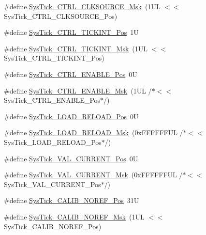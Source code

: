 \begin{DoxyCompactItemize}
\item 
\#define \hyperlink{group___c_m_s_i_s___sys_tick_gaa41d06039797423a46596bd313d57373}{Sys\+Tick\+\_\+\+C\+T\+R\+L\+\_\+\+C\+L\+K\+S\+O\+U\+R\+C\+E\+\_\+\+Msk}~(1\+U\+L $<$$<$ Sys\+Tick\+\_\+\+C\+T\+R\+L\+\_\+\+C\+L\+K\+S\+O\+U\+R\+C\+E\+\_\+\+Pos)
\item 
\#define \hyperlink{group___c_m_s_i_s___sys_tick_ga88f45bbb89ce8df3cd2b2613c7b48214}{Sys\+Tick\+\_\+\+C\+T\+R\+L\+\_\+\+T\+I\+C\+K\+I\+N\+T\+\_\+\+Pos}~1U
\item 
\#define \hyperlink{group___c_m_s_i_s___sys_tick_ga95bb984266ca764024836a870238a027}{Sys\+Tick\+\_\+\+C\+T\+R\+L\+\_\+\+T\+I\+C\+K\+I\+N\+T\+\_\+\+Msk}~(1\+U\+L $<$$<$ Sys\+Tick\+\_\+\+C\+T\+R\+L\+\_\+\+T\+I\+C\+K\+I\+N\+T\+\_\+\+Pos)
\item 
\#define \hyperlink{group___c_m_s_i_s___sys_tick_ga0b48cc1e36d92a92e4bf632890314810}{Sys\+Tick\+\_\+\+C\+T\+R\+L\+\_\+\+E\+N\+A\+B\+L\+E\+\_\+\+Pos}~0U
\item 
\#define \hyperlink{group___c_m_s_i_s___sys_tick_ga16c9fee0ed0235524bdeb38af328fd1f}{Sys\+Tick\+\_\+\+C\+T\+R\+L\+\_\+\+E\+N\+A\+B\+L\+E\+\_\+\+Msk}~(1\+U\+L /$\ast$$<$$<$ Sys\+Tick\+\_\+\+C\+T\+R\+L\+\_\+\+E\+N\+A\+B\+L\+E\+\_\+\+Pos$\ast$/)
\item 
\#define \hyperlink{group___c_m_s_i_s___sys_tick_gaf44d10df359dc5bf5752b0894ae3bad2}{Sys\+Tick\+\_\+\+L\+O\+A\+D\+\_\+\+R\+E\+L\+O\+A\+D\+\_\+\+Pos}~0U
\item 
\#define \hyperlink{group___c_m_s_i_s___sys_tick_ga265912a7962f0e1abd170336e579b1b1}{Sys\+Tick\+\_\+\+L\+O\+A\+D\+\_\+\+R\+E\+L\+O\+A\+D\+\_\+\+Msk}~(0x\+F\+F\+F\+F\+F\+F\+U\+L /$\ast$$<$$<$ Sys\+Tick\+\_\+\+L\+O\+A\+D\+\_\+\+R\+E\+L\+O\+A\+D\+\_\+\+Pos$\ast$/)
\item 
\#define \hyperlink{group___c_m_s_i_s___sys_tick_ga3208104c3b019b5de35ae8c21d5c34dd}{Sys\+Tick\+\_\+\+V\+A\+L\+\_\+\+C\+U\+R\+R\+E\+N\+T\+\_\+\+Pos}~0U
\item 
\#define \hyperlink{group___c_m_s_i_s___sys_tick_gafc77b56d568930b49a2474debc75ab45}{Sys\+Tick\+\_\+\+V\+A\+L\+\_\+\+C\+U\+R\+R\+E\+N\+T\+\_\+\+Msk}~(0x\+F\+F\+F\+F\+F\+F\+U\+L /$\ast$$<$$<$ Sys\+Tick\+\_\+\+V\+A\+L\+\_\+\+C\+U\+R\+R\+E\+N\+T\+\_\+\+Pos$\ast$/)
\item 
\#define \hyperlink{group___c_m_s_i_s___sys_tick_ga534dbe414e7a46a6ce4c1eca1fbff409}{Sys\+Tick\+\_\+\+C\+A\+L\+I\+B\+\_\+\+N\+O\+R\+E\+F\+\_\+\+Pos}~31U
\item 
\#define \hyperlink{group___c_m_s_i_s___sys_tick_ga3af0d891fdd99bcc8d8912d37830edb6}{Sys\+Tick\+\_\+\+C\+A\+L\+I\+B\+\_\+\+N\+O\+R\+E\+F\+\_\+\+Msk}~(1\+U\+L $<$$<$ Sys\+Tick\+\_\+\+C\+A\+L\+I\+B\+\_\+\+N\+O\+R\+E\+F\+\_\+\+Pos)
$$
\end{DoxyCompactItemize}
